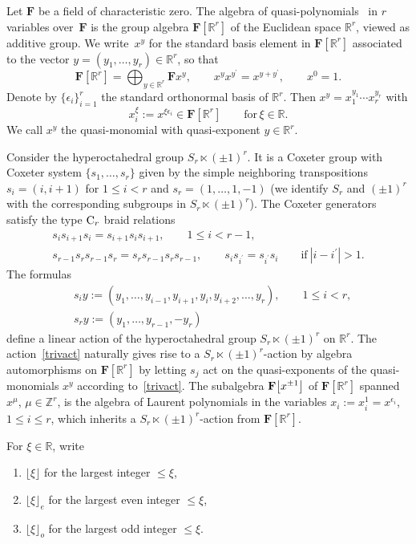 \documentclass[pdftex]{sigma}
\numberwithin{equation}{section}
\begin{document}
{\mypar\label{1.2}
Let $\mathbf{F}$ be a field of characteristic zero. The algebra of quasi-polynomials~\cite{SSV2} in $r$ variables over~$\mathbf{F}$ is the group algebra $\mathbf{F}[\mathbb{R}^r]$ of the Euclidean space $\mathbb{R}^r$, viewed as additive group. We write~$x^y$ for the standard basis element in $\mathbf{F}[\mathbb{R}^r]$ associated to
the vector $y=(y_1,\dots,y_r)\in\mathbb{R}^r$, so that
\[
\mathbf{F}[\mathbb{R}^r]=\bigoplus_{y\in\mathbb{R}^r}\mathbf{F}x^y,\qquad x^yx^{y^\prime}=x^{y+y^\prime},\qquad x^0=1.
\]
Denote by $\{\epsilon_i\}_{i=1}^r$ the standard orthonormal basis of $\mathbb{R}^r$. Then $x^y=x_1^{y_1}\cdots x_r^{y_r}$ with
\[
x_i^{\xi}:=x^{\xi\epsilon_i}\in\mathbf{F}[\mathbb{R}^r]\qquad \text{for}\, \xi\in\mathbb{R}.
\]
We call $x^y$ the quasi-monomial with quasi-exponent $y\in\mathbb{R}^r$.

Consider the hyperoctahedral group $S_r\ltimes (\pm 1)^r$. It is a Coxeter group with Coxeter system $\{s_1,\dots,s_r\}$ given by the simple neighboring transpositions
$s_i=(i,i+1)$ for $1\leq i<r$ and $s_r=(1,\dots,1,-1)$ (we identify $S_r$ and $(\pm 1)^r$ with the corresponding subgroups in $S_r\ltimes (\pm 1)^r$).
The Coxeter generators satisfy the type ${\rm C}_r$ braid relations
\begin{gather}
s_is_{i+1}s_i=s_{i+1}s_is_{i+1},\qquad 1\leq i<r-1,\nonumber\\
s_{r-1}s_rs_{r-1}s_r=s_rs_{r-1}s_rs_{r-1},\qquad
s_is_{i^\prime}=s_{i^\prime}s_i\qquad \text{if}\ |i-i^\prime|>1.\label{braidC}
\end{gather}
The formulas
\begin{align}
&s_iy:=(y_1,\dots,y_{i-1},y_{i+1},y_i,y_{i+2},\dots,y_r),\qquad 1\leq i<r,\nonumber\\
&s_ry:=(y_1,\dots,y_{r-1},-y_r)\label{trivact}
\end{align}
define a linear action of the hyperoctahedral group $S_r\ltimes (\pm 1)^r$ on $\mathbb{R}^r$.
The action~\eqref{trivact} naturally gives rise to a $S_r\ltimes (\pm 1)^r$-action
by algebra automorphisms on $\mathbf{F}[\mathbb{R}^r]$
by letting
$s_j$ act on the quasi-exponents of the quasi-monomials $x^y$ according to~\eqref{trivact}.
The subalgebra $\mathbf{F}\smash{\bigl[x^{\pm 1}\bigr]}$ of $\mathbf{F}[\mathbb{R}^r]$ spanned $x^\mu$, $\mu\in\mathbb{Z}^r$, is the algebra of Laurent polynomials in the variables $x_i:=x_i^1=x^{\epsilon_i}$, $1\leq i\leq r$, which inherits a $S_r\ltimes (\pm 1)^r$-action from $\mathbf{F}[\mathbb{R}^r]$.

For $\xi\in\mathbb{R}$, write
\begin{enumerate}\itemsep=0pt
\item[] $\lfloor\xi\rfloor$ for the largest integer $\leq\xi$,
\item[] $\lfloor\xi\rfloor_e$ for the largest even integer $\leq\xi$,
\item[]
$\lfloor\xi\rfloor_o$ for the largest odd integer $\leq\xi$.
\end{enumerate}


}
\end{document}
